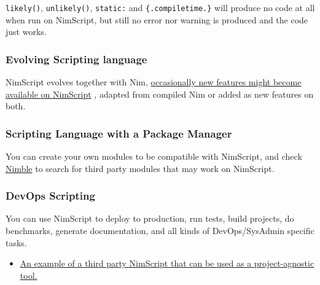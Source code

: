 \texttt{likely()}, \texttt{unlikely()}, \texttt{static:} and
\texttt{\{.compiletime.\}} will produce no code at all when run on
NimScript, but still no error nor warning is produced and the code just
works.

\hypertarget{evolving-scripting-language}{%
\subsubsection{Evolving Scripting
language}\label{evolving-scripting-language}}

NimScript evolves together with Nim,
\href{https://github.com/nim-lang/Nim/pulls?utf8=\%E2\%9C\%93\&q=nimscript}{occasionally
new features might become available on NimScript} , adapted from
compiled Nim or added as new features on both.

\hypertarget{scripting-language-with-a-package-manager}{%
\subsubsection{Scripting Language with a Package
Manager}\label{scripting-language-with-a-package-manager}}

You can create your own modules to be compatible with NimScript, and
check \href{https://nimble.directory}{Nimble} to search for third party
modules that may work on NimScript.

\hypertarget{devops-scripting}{%
\subsubsection{DevOps Scripting}\label{devops-scripting}}

You can use NimScript to deploy to production, run tests, build
projects, do benchmarks, generate documentation, and all kinds of
DevOps/SysAdmin specific tasks.

\begin{itemize}
\tightlist
\item
  \href{https://github.com/kaushalmodi/nim_config\#list-available-tasks}{An
  example of a third party NimScript that can be used as a
  project-agnostic tool.}
\end{itemize}
